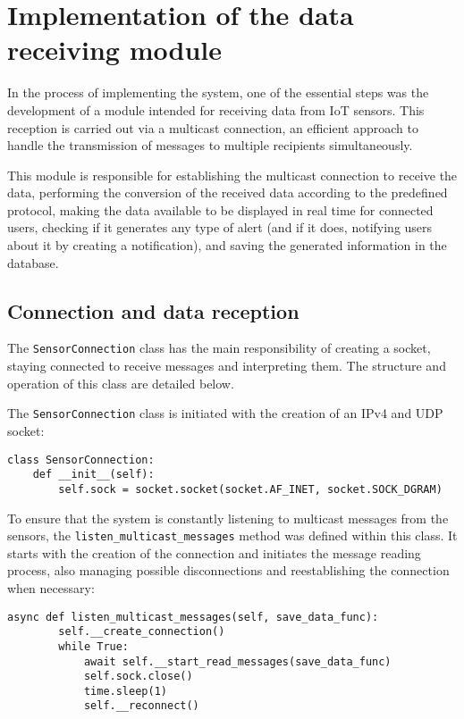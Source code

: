 \section{Implementation of the data receiving module}\label{sec:Implementation of the data receiving module}

In the process of implementing the system, one of the essential steps was the development of a module intended for receiving data from IoT sensors. This reception is carried out via a multicast connection, an efficient approach to handle the transmission of messages to multiple recipients simultaneously.

This module is responsible for establishing the multicast connection to receive the data, performing the conversion of the received data according to the predefined protocol, making the data available to be displayed in real time for connected users, checking if it generates any type of alert (and if it does, notifying users about it by creating a notification), and saving the generated information in the database.

\subsection[Connection and data reception]{Connection and data reception}\label{subsec:Connection and data reception}

The \texttt{SensorConnection} class has the main responsibility of creating a socket, staying connected to receive messages and interpreting them. The structure and operation of this class are detailed below.

The \texttt{SensorConnection} class is initiated with the creation of an IPv4 and UDP socket:

\begin{Verbatim}[fontsize=\small, baselinestretch=0.8]
class SensorConnection:
    def __init__(self):
        self.sock = socket.socket(socket.AF_INET, socket.SOCK_DGRAM)
\end{Verbatim}

To ensure that the system is constantly listening to multicast messages from the sensors, the \texttt{listen\_multicast\_messages} method was defined within this class. It starts with the creation of the connection and initiates the message reading process, also managing possible disconnections and reestablishing the connection when necessary:

\begin{Verbatim}[fontsize=\small, baselinestretch=0.8]
    async def listen_multicast_messages(self, save_data_func):
        self.__create_connection()
        while True:
            await self.__start_read_messages(save_data_func)
            self.sock.close()
            time.sleep(1)
            self.__reconnect()
\end{Verbatim}

